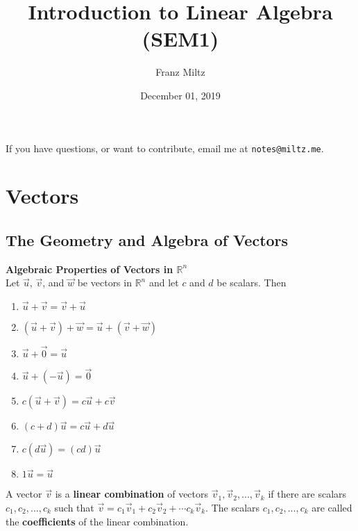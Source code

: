 \documentclass{article}
\begin{document}
\title{Introduction to Linear Algebra (SEM1)}
\author{Franz Miltz}
\date{December 01, 2019}
\maketitle
\noindent If you have questions, or want to contribute, email me at \texttt{notes@miltz.me}.
\tableofcontents
\pagebreak
\section{Vectors}
\subsection{The Geometry and Algebra of Vectors}
\begin{theorem}
	\textbf{Algebraic Properties of Vectors in $\mathbb{R}^n$}\\
	Let $\vec u$, $\vec v$, and $\vec w$ be vectors in $\mathbb{R}^n$ and let $c$ and $d$ be scalars. Then
	\begin{enumerate}
		\item $\vec u + \vec v = \vec v + \vec u$
		\item $(\vec u + \vec v) + \vec w = \vec u + (\vec v + \vec w)$
		\item $\vec u + \vec 0 = \vec u$
		\item $\vec u + (- \vec u) = \vec 0$
		\item $c(\vec u + \vec v) = c\vec u + c\vec v$
		\item $(c+d)\vec u = c\vec u + d\vec u$
		\item $c(d\vec u) = (cd)\vec u$
		\item $1\vec u = \vec u$
	\end{enumerate}
\end{theorem}
\begin{definition}
	A vector $\vec v$ is a \textbf{linear combination} of vectors $\vec v_1, \vec v_2, ...,\vec v_k$ if there are scalars $c_1, c_2, ..., c_k$ such that $\vec v = c_1 \vec v_1 + c_2 \vec v_2 + \cdots c_k\vec v_k$. The scalars $c_1, c_2, ..., c_k$ are called the \textbf{coefficients} of the linear combination.
\end{definition}
\end{document}
